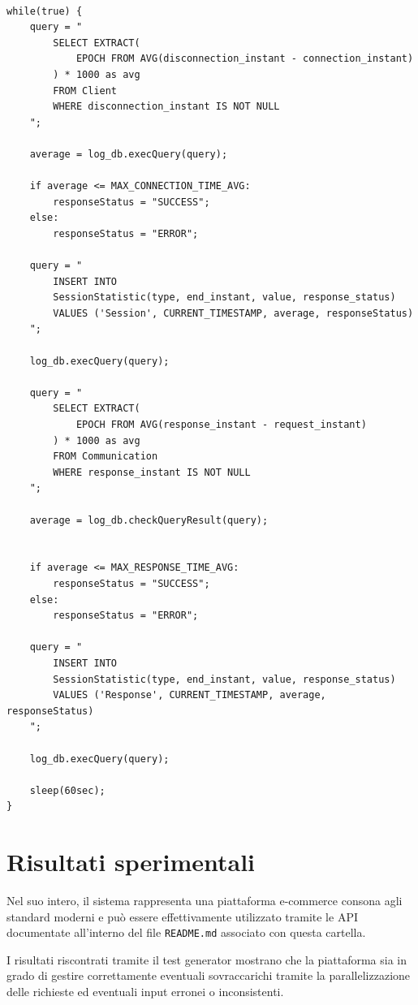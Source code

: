 \documentclass[12pt]{report}
\begin{document}
\begin{verbatim}

while(true) {
    query = "
        SELECT EXTRACT(
            EPOCH FROM AVG(disconnection_instant - connection_instant)
        ) * 1000 as avg
        FROM Client
        WHERE disconnection_instant IS NOT NULL
    ";

    average = log_db.execQuery(query);

    if average <= MAX_CONNECTION_TIME_AVG:
        responseStatus = "SUCCESS";
    else:
        responseStatus = "ERROR";

    query = "
        INSERT INTO
        SessionStatistic(type, end_instant, value, response_status)
        VALUES ('Session', CURRENT_TIMESTAMP, average, responseStatus)
    ";

    log_db.execQuery(query);

    query = "
        SELECT EXTRACT(
            EPOCH FROM AVG(response_instant - request_instant)
        ) * 1000 as avg
        FROM Communication
        WHERE response_instant IS NOT NULL
    ";

    average = log_db.checkQueryResult(query);

    
    if average <= MAX_RESPONSE_TIME_AVG:
        responseStatus = "SUCCESS";
    else:
        responseStatus = "ERROR";

    query = "
        INSERT INTO
        SessionStatistic(type, end_instant, value, response_status)
        VALUES ('Response', CURRENT_TIMESTAMP, average, responseStatus)
    ";

    log_db.execQuery(query);

    sleep(60sec);
}

\end{verbatim}

\quad

    \section{Risultati sperimentali}

    Nel suo intero, il sistema rappresenta una piattaforma e-commerce consona agli standard moderni e può essere effettivamente utilizzato tramite le API documentate all'interno del file \texttt{README.md} associato con questa cartella.

    I risultati riscontrati tramite il test generator mostrano che la piattaforma sia in grado di gestire correttamente eventuali sovraccarichi tramite la parallelizzazione delle richieste ed eventuali input erronei o inconsistenti.
\end{document}

